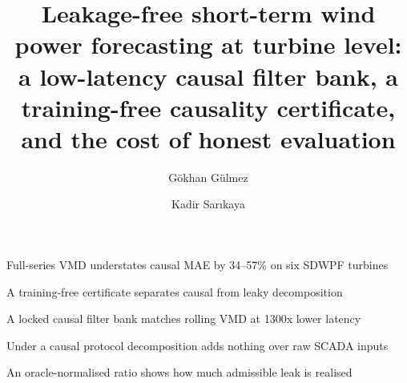 \documentclass[review,3p,times]{elsarticle}
\begin{document}
\begin{frontmatter}

\title{Leakage-free short-term wind power forecasting at turbine level:
a low-latency causal filter bank, a training-free causality certificate,
and the cost of honest evaluation}

\author[tog-ce]{Gökhan Gülmez}
\author[tog-ie]{Kadir Sarıkaya}


\begin{highlights}
\item Full-series VMD understates causal MAE by 34--57\% on six SDWPF turbines %
\item A training-free certificate separates causal from leaky decomposition %
\item A locked causal filter bank matches rolling VMD at 1300x lower latency %
\item Under a causal protocol decomposition adds nothing over raw SCADA inputs %
\item An oracle-normalised ratio shows how much admissible leak is realised %
\end{highlights}


\end{frontmatter}
\end{document}
